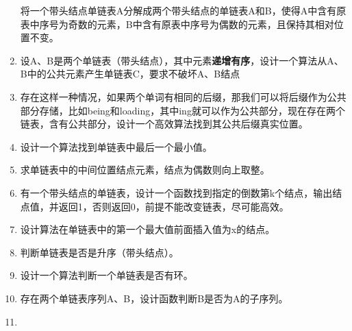 \documentclass[lang=cn,newtx,10pt,scheme=chinese]{../../elegantbook}
\begin{document}
\begin{enumerate}
  将一个带头结点单链表A分解成两个带头结点的单链表A和B，使得A中含有原表中序号为奇数的元素，B中含有原表中序号为偶数的元素，且保持其相对位置不变。
  
\vspace{5cm}
\item
  
  设A、B是两个单链表（带头结点），其中元素\textbf{递增有序}，设计一个算法从A、B中的公共元素产生单链表C，要求不破坏A、B结点
  
\vspace{5cm}
\item
  
  存在这样一种情况，如果两个单词有相同的后缀，那我们可以将后缀作为公共部分存储，比如being和loading，其中ing就可以作为公共部分，现在存在两个链表，含有公共部分，设计一个高效算法找到其公共后缀真实位置。
  
\vspace{5cm}
\item
  
  设计一个算法找到单链表中最后一个最小值。
  
\vspace{5cm}
\item
  
  求单链表中的中间位置结点元素，结点为偶数则向上取整。
  
\vspace{5cm}
\item
  
  有一个带头结点的单链表，设计一个函数找到指定的倒数第k个结点，输出结点值，并返回1，否则返回0，前提不能改变链表，尽可能高效。
  
\vspace{5cm}
\item
  
  设计算法在单链表中的第一个最大值前面插入值为x的结点。
  
\vspace{5cm}
\item
  
  判断单链表是否是升序（带头结点）。
  
\vspace{5cm}
\item
  
  设计一个算法判断一个单链表是否有环。
  
\vspace{5cm}
\item
  
  存在两个单链表序列A、B，设计函数判断B是否为A的子序列。
  
\vspace{5cm}
\item
  

\end{enumerate}
\end{document}
